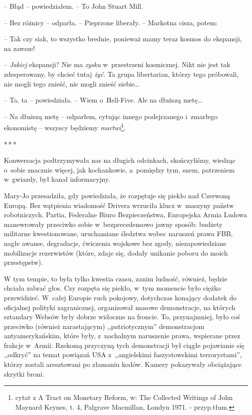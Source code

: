 \documentclass[oneside,polish,12pt,sfheadings]{mwbk}
\newcommand{\threeast}{\bigskip\par\centerline{*\,*\,*}\medskip\par}%
\begin{document}
-- Błąd -- powiedziałem. -- To John Stuart Mill.

-- Bez różnicy -- odparła. -- Pieprzone liberały. -- Markotna cisza, potem:

-- Tak czy siak, to wszystko brednie, ponieważ mamy teraz kosmos do
ekspansji, na zawsze!

-- \emph{Jakiej } ekspansji? Nie ma \emph{zysku} w~przestrzeni
kosmicznej. Nikt nie jest tak zdesperowany, by chcieć tutaj \emph{żyć}.
Ta grupa libertarian, którzy tego próbowali, nie mogli tego znieść, nie
mogli znieść siebie\ldots

-- Ta, ta -- powiedziała. -- Wiem o~Hell-Five. Ale na dłuższą metę\ldots

-- Na dłuższą metę -- odparłem, cytując innego podejrzanego i~zmarłego
ekonomistę -- wszyscy będziemy \emph{martwi}\footnote{cytat z A
Tract on Monetary Reform, w: The Collected Writings of John Maynard
Keynes, t. 4, Palgrave Macmillan, Londyn 1971. - przyp.tłum.}.

\threeast

Konwersacja podtrzymywała nas na długich odcinkach, skończyliśmy,
wiedząc o~sobie znacznie więcej, jak kochankowie, a~pomiędzy tym, snem,
patrzeniem w~gwiazdy, był kanał informacyjny.

Mary-Jo przesadziła, gdy powiedziała, że rozpętuje się piekło nad
Czerwoną Europą. Bez wątpienia wiadomość Drivera wrzuciła klucz w~maszyny państw robotniczych. Partia, Federalne Biuro Bezpieczeństwa,
Europejska Armia Ludowa manewrowały przeciwko sobie w~bezprecedensowo
jawny sposób: budżety militarne kwestionowane, uruchamiane śledztwa
wobec naruszeń prawa FBB, nagłe awanse, degradacje, ćwiczenia wojskowe
bez zgody, niezapowiedziane mobilizacje rezerwistów (które, zdaje się,
dodały unikanie poboru do moich przestępstw).

W tym tempie, to była tylko kwestia czasu, zanim ludność, również,
będzie chciała zabrać głos. Czy rozpęta się piekło, w~tym momencie było
ciężko przewidzieć. W~całej Europie ruch pokojowy, dotychczas konający
dodatek do oficjalnej polityki zagranicznej, organizował masowe
demonstracje, na których sztandary Websów były dobrze widoczne na
froncie. To, przynajmniej, było coś przeciwko (również narastającym)
,,patriotycznym'' demonstracjom antyamerykańskim, które były, z~nachalnym
naruszenie prawa, wspierane przez frakcje w~Armii. Rzekomą przyczyną
tych demonstracji był ciągłe pojawianie się ,,odkryć'' na temat powiązań
USA z~,,angielskimi faszystowskimi terrorystami'', którzy zostali
aresztowani po złamaniu kodów. Kamery pokazywały obciążające skrytki
broni.
\end{document}

